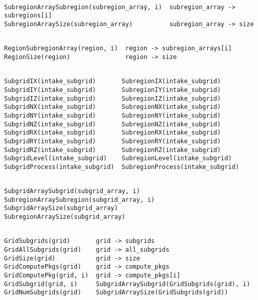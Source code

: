 \begin{display}\begin{verbatim}

SubregionArraySubregion(subregion_array, i)  subregion_array -> subregions[i]
SubregionArraySize(subregion_array)          subregion_array -> size

\end{verbatim}\end{display}

\begin{display}\begin{verbatim}

RegionSubregionArray(region, i)  region -> subregion_arrays[i]
RegionSize(region)               region -> size

\end{verbatim}\end{display}

\begin{display}\begin{verbatim}

SubgridIX(intake_subgrid)       SubregionIX(intake_subgrid)
SubgridIY(intake_subgrid)       SubregionIY(intake_subgrid)
SubgridIZ(intake_subgrid)       SubregionIZ(intake_subgrid)
SubgridNX(intake_subgrid)       SubregionNX(intake_subgrid)
SubgridNY(intake_subgrid)       SubregionNY(intake_subgrid)
SubgridNZ(intake_subgrid)       SubregionNZ(intake_subgrid)
SubgridRX(intake_subgrid)       SubregionRX(intake_subgrid)
SubgridRY(intake_subgrid)       SubregionRY(intake_subgrid)
SubgridRZ(intake_subgrid)       SubregionRZ(intake_subgrid)
SubgridLevel(intake_subgrid)    SubregionLevel(intake_subgrid)
SubgridProcess(intake_subgrid)  SubregionProcess(intake_subgrid)

\end{verbatim}\end{display}

\begin{display}\begin{verbatim}

SubgridArraySubgrid(subgrid_array, i)  SubregionArraySubregion(subgrid_array, i)
SubgridArraySize(subgrid_array)        SubregionArraySize(subgrid_array)

\end{verbatim}\end{display}

\begin{display}\begin{verbatim}

GridSubgrids(grid)       grid -> subgrids
GridAllSubgrids(grid)    grid -> all_subgrids
GridSize(grid)           grid -> size
GridComputePkgs(grid)    grid -> compute_pkgs
GridComputePkg(grid, i)  grid -> compute_pkgs[i]
GridSubgrid(grid, i)     SubgridArraySubgrid(GridSubgrids(grid), i)
GridNumSubgrids(grid)    SubgridArraySize(GridSubgrids(grid))

\end{verbatim}\end{display}

